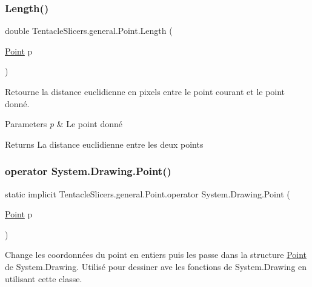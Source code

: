 \subsubsection{\texorpdfstring{Length()}{Length()}}
{\footnotesize\ttfamily double Tentacle\+Slicers.\+general.\+Point.\+Length (\begin{DoxyParamCaption}\item[{\hyperlink{class_tentacle_slicers_1_1general_1_1_point}{Point}}]{p }\end{DoxyParamCaption})}



Retourne la distance euclidienne en pixels entre le point courant et le point donné. 


\begin{DoxyParams}{Parameters}
{\em p} & Le point donné \\
\hline
\end{DoxyParams}
\begin{DoxyReturn}{Returns}
La distance euclidienne entre les deux points 
\end{DoxyReturn}
\mbox{\label{class_tentacle_slicers_1_1general_1_1_point_a65efc1d175521859132daa1046577d89}} 
\subsubsection{\texorpdfstring{operator System.\+Drawing.\+Point()}{operator System.Drawing.Point()}}
{\footnotesize\ttfamily static implicit Tentacle\+Slicers.\+general.\+Point.\+operator System.\+Drawing.\+Point (\begin{DoxyParamCaption}\item[{\hyperlink{class_tentacle_slicers_1_1general_1_1_point}{Point}}]{p }\end{DoxyParamCaption})\hspace{0.3cm}{\ttfamily [static]}}



Change les coordonnées du point en entiers puis les passe dans la structure \hyperlink{class_tentacle_slicers_1_1general_1_1_point}{Point} de System.\+Drawing. Utilisé pour dessiner ave les fonctions de System.\+Drawing en utilisant cette classe. 


